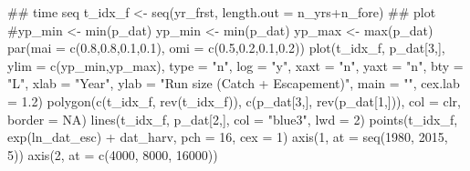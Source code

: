 \documentclass[
  11pt,
]{article}
\newenvironment{Shaded}{}{}
\newcommand{\CommentTok}[1]{\textcolor[rgb]{0.00,0.50,0.00}{#1}}
\newcommand{\DataTypeTok}[1]{#1}
\newcommand{\DecValTok}[1]{#1}
\newcommand{\FloatTok}[1]{#1}
\newcommand{\KeywordTok}[1]{\textcolor[rgb]{0.00,0.00,1.00}{#1}}
\newcommand{\NormalTok}[1]{#1}
\newcommand{\OperatorTok}[1]{#1}
\newcommand{\OtherTok}[1]{\textcolor[rgb]{1.00,0.25,0.00}{#1}}
\newcommand{\StringTok}[1]{\textcolor[rgb]{0.00,0.50,0.50}{#1}}
\begin{document}
\begin{Shaded}
\begin{Highlighting}[]
\CommentTok{## time seq}
\NormalTok{t_idx_f <-}\StringTok{ }\KeywordTok{seq}\NormalTok{(yr_frst, }\DataTypeTok{length.out =}\NormalTok{ n_yrs}\OperatorTok{+}\NormalTok{n_fore)}
\CommentTok{## plot}
\CommentTok{#yp_min <- min(p_dat)}
\NormalTok{yp_min <-}\StringTok{ }\KeywordTok{min}\NormalTok{(p_dat)}
\NormalTok{yp_max <-}\StringTok{ }\KeywordTok{max}\NormalTok{(p_dat)}
\KeywordTok{par}\NormalTok{(}\DataTypeTok{mai =} \KeywordTok{c}\NormalTok{(}\FloatTok{0.8}\NormalTok{,}\FloatTok{0.8}\NormalTok{,}\FloatTok{0.1}\NormalTok{,}\FloatTok{0.1}\NormalTok{), }\DataTypeTok{omi =} \KeywordTok{c}\NormalTok{(}\FloatTok{0.5}\NormalTok{,}\FloatTok{0.2}\NormalTok{,}\FloatTok{0.1}\NormalTok{,}\FloatTok{0.2}\NormalTok{))}
\KeywordTok{plot}\NormalTok{(t_idx_f, p_dat[}\DecValTok{3}\NormalTok{,], }\DataTypeTok{ylim =} \KeywordTok{c}\NormalTok{(yp_min,yp_max), }\DataTypeTok{type =} \StringTok{"n"}\NormalTok{,}
     \DataTypeTok{log =} \StringTok{"y"}\NormalTok{, }\DataTypeTok{xaxt =} \StringTok{"n"}\NormalTok{, }\DataTypeTok{yaxt =} \StringTok{"n"}\NormalTok{, }\DataTypeTok{bty =} \StringTok{"L"}\NormalTok{,}
     \DataTypeTok{xlab =} \StringTok{"Year"}\NormalTok{, }\DataTypeTok{ylab =} \StringTok{"Run size (Catch + Escapement)"}\NormalTok{, }\DataTypeTok{main =} \StringTok{""}\NormalTok{, }\DataTypeTok{cex.lab =} \FloatTok{1.2}\NormalTok{)}
\KeywordTok{polygon}\NormalTok{(}\KeywordTok{c}\NormalTok{(t_idx_f, }\KeywordTok{rev}\NormalTok{(t_idx_f)), }\KeywordTok{c}\NormalTok{(p_dat[}\DecValTok{3}\NormalTok{,], }\KeywordTok{rev}\NormalTok{(p_dat[}\DecValTok{1}\NormalTok{,])),}
        \DataTypeTok{col =}\NormalTok{ clr, }\DataTypeTok{border =} \OtherTok{NA}\NormalTok{)}
\KeywordTok{lines}\NormalTok{(t_idx_f, p_dat[}\DecValTok{2}\NormalTok{,], }\DataTypeTok{col =} \StringTok{"blue3"}\NormalTok{, }\DataTypeTok{lwd =} \DecValTok{2}\NormalTok{)}
\KeywordTok{points}\NormalTok{(t_idx_f, }\KeywordTok{exp}\NormalTok{(ln_dat_esc) }\OperatorTok{+}\StringTok{ }\NormalTok{dat_harv, }\DataTypeTok{pch =} \DecValTok{16}\NormalTok{, }\DataTypeTok{cex =} \DecValTok{1}\NormalTok{)}
\KeywordTok{axis}\NormalTok{(}\DecValTok{1}\NormalTok{, }\DataTypeTok{at =} \KeywordTok{seq}\NormalTok{(}\DecValTok{1980}\NormalTok{, }\DecValTok{2015}\NormalTok{, }\DecValTok{5}\NormalTok{))}
\KeywordTok{axis}\NormalTok{(}\DecValTok{2}\NormalTok{, }\DataTypeTok{at =} \KeywordTok{c}\NormalTok{(}\DecValTok{4000}\NormalTok{, }\DecValTok{8000}\NormalTok{, }\DecValTok{16000}\NormalTok{))}
\end{Highlighting}
\end{Shaded}
\end{document}
